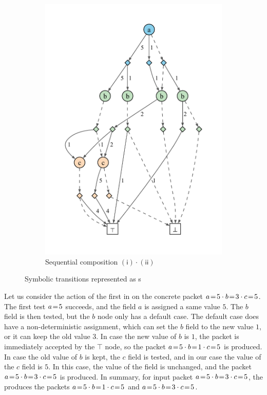 \documentclass[acmsmall,dvipsnames,nonacm]{acmart}
\begin{document}
\begin{figure}
\begin{subfigure}[b]{0.33\textwidth}
    \end{subfigure}
    \begin{subfigure}[b]{0.38\textwidth}
        \centering
        \includegraphics[scale=0.5]{viz/spp1seq2.pdf}
        \caption{Sequential composition $(\mathsf{i}) \cdot (\mathsf{ii})$}
        \label{fig:spp1seq2}
    \end{subfigure}
    \caption{Symbolic transitions represented as \SPPn{}s}
    \label{fig:symt}
\end{figure}

Let us consider the action of the first \SPPn{} in  on the concrete packet $a \mathrel{\!=\!} 5 \cdot b \mathrel{\!=\!} 3 \cdot c \mathrel{\!=\!} 5$. The first test $a \mathrel{\!=\!} 5$ succeeds, and the field $a$ is assigned a same value $5$. The $b$ field is then tested, but the $b$ node only has a default case. The default case does have a non-deterministic assignment, which can set the $b$ field to the new value $1$, or it can keep the old value $3$. In case the new value of $b$ is $1$, the packet is immediately accepted by the $\top$ node, so the packet $a \mathrel{\!=\!} 5 \cdot b \mathrel{\!=\!} 1 \cdot c \mathrel{\!=\!} 5$ is produced. In case the old value of $b$ is kept, the $c$ field is tested, and in our case the value of the $c$ field is $5$. In this case, the value of the field is unchanged, and the packet $a \mathrel{\!=\!} 5 \cdot b \mathrel{\!=\!} 3 \cdot c \mathrel{\!=\!} 5$ is produced.
In summary, for input packet $a \mathrel{\!=\!} 5 \cdot b \mathrel{\!=\!} 3 \cdot c \mathrel{\!=\!} 5$, the \SPPn{} produces the packets $a \mathrel{\!=\!} 5 \cdot b \mathrel{\!=\!} 1 \cdot c \mathrel{\!=\!} 5$ and $a \mathrel{\!=\!} 5 \cdot b \mathrel{\!=\!} 3 \cdot c \mathrel{\!=\!} 5$.
\end{document}
